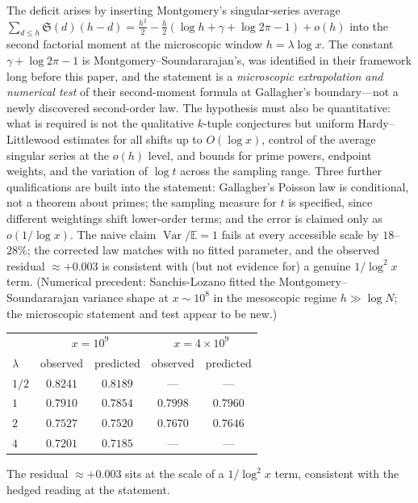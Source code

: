 \documentclass[11pt]{article}
\theoremstyle{definition}
\newcommand{\SG}{\mathfrak S}
\begin{document}
The deficit arises by inserting Montgomery's singular-series average
$\sum_{d\le h}\SG(d)(h-d)=\tfrac{h^2}2-\tfrac h2(\log h+\gamma+\log2\pi
-1)+o(h)$ into the second factorial moment at the microscopic window
$h=\lambda\log x$.  The constant $\gamma+\log2\pi-1$ is
Montgomery--Soundararajan's, was
identified in their framework long before this paper, and the statement
is a \emph{microscopic extrapolation and numerical test} of their
second-moment formula at Gallagher's boundary---not a newly discovered
second-order law.  The hypothesis must also be quantitative: what is
required is not the qualitative $k$-tuple conjectures but uniform
Hardy--Littlewood estimates for all shifts up to $O(\log x)$, control
of the average singular series at the $o(h)$ level, and bounds for
prime powers, endpoint weights, and the variation of $\log t$ across
the sampling range.  Three further qualifications are built into the
statement: Gallagher's Poisson law is conditional, not a theorem about
primes; the sampling measure for $t$ is specified, since different
weightings shift lower-order terms; and the error is claimed only as
$o(1/\log x)$.  The naive claim $\operatorname{Var}/\mathbb E=1$ fails at
every accessible scale by $18$--$28\%$; the corrected law matches with
no fitted parameter, and the observed residual $\approx+0.003$ is
consistent with (but not evidence for) a genuine $1/\log^2x$ term.
(Numerical precedent: Sanchis-Lozano \cite{SL} fitted the
Montgomery--Soundararajan variance shape at $x\sim10^8$ in the
mesoscopic regime $h\gg\log N$; the microscopic statement and test
appear to be new.)

\begin{center}\small
\begin{tabular}{lcccc}
\toprule
 & \multicolumn{2}{c}{$x=10^9$} & \multicolumn{2}{c}{$x=4\times10^9$}\\
$\lambda$ & observed & predicted & observed & predicted\\
\midrule
$1/2$ & $0.8241$ & $0.8189$ & --- & ---\\
$1$   & $0.7910$ & $0.7854$ & $0.7998$ & $0.7960$\\
$2$   & $0.7527$ & $0.7520$ & $0.7670$ & $0.7646$\\
$4$   & $0.7201$ & $0.7185$ & --- & ---\\
\bottomrule
\end{tabular}
\end{center}

\noindent The residual $\approx+0.003$ sits at the scale of a $1/\log^2x$ term, consistent with the hedged reading at the statement.
\end{document}

